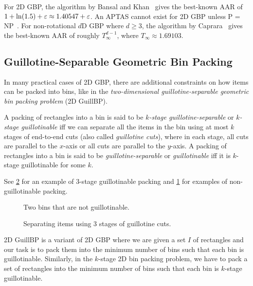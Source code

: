 For 2D GBP, the algorithm by Bansal and Khan~\cite{bansal2014binpacking}
gives the best-known AAR of $1 + \ln(1.5) + \varepsilon \approx 1.40547 + \varepsilon$.
An APTAS cannot exist for 2D GBP unless P = NP~\cite{bansal2006bin,chlebik2009hardness}.
For non-rotational $d$D GBP where $d \ge 3$, the algorithm by Caprara~\cite{caprara2008}
gives the best-known AAR of roughly $T_{\infty}^{d-1}$, where $T_{\infty} \approx 1.69103$.

\subsection{Guillotine-Separable Geometric Bin Packing}
\label{sec:intro:guill-bp}

In many practical cases of 2D GBP, there are additional constraints on
how items can be packed into bins, like in the
\emph{two-dimensional guillotine-separable geometric bin packing problem} (2D GuillBP).

\begin{definition}
A packing of rectangles into a bin is said to be
\emph{$k$-stage guillotine-separable} or \emph{$k$-stage guillotinable}
iff we can separate all the items in the bin using at most $k$ stages of end-to-end cuts
(also called \emph{guillotine cuts}), where in each stage,
all cuts are parallel to the $x$-axis or all cuts are parallel to the $y$-axis.
A packing of rectangles into a bin is said to be \emph{guillotine-separable}
or \emph{guillotinable} iff it is $k$-stage guillotinable for some $k$.
\end{definition}

See \cref{fig:guill} for an example of 3-stage guillotinable packing
and \cref{fig:non-guill} for examples of non-guillotinable packing.

\begin{figure}[htb]
\centering

\caption{Two bins that are not guillotinable.}
\label{fig:non-guill}
\end{figure}
\begin{figure}[htb]
\centering

\caption{Separating items using 3 stages of guillotine cuts.}
\label{fig:guill}
\end{figure}

2D GuillBP is a variant of 2D GBP where we are given a set $I$ of rectangles and
our task is to pack them into the minimum number of bins such that each bin is guillotinable.
Similarly, in the $k$-stage 2D bin packing problem, we have to pack a set of rectangles
into the minimum number of bins such that each bin is $k$-stage guillotinable.


